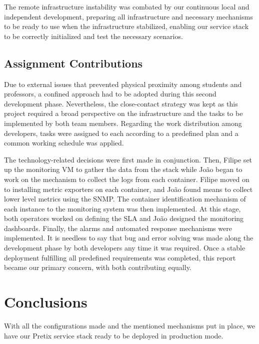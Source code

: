 \documentclass[12pt]{article}
\begin{document}
The remote infrastructure instability was combated by our continuous local and independent development, preparing all infrastructure and necessary mechanisms to be ready to use when the infrastructure stabilized, enabling our service stack to be correctly initialized and test the necessary scenarios.

\subsection{Assignment Contributions} \label{remarks.contributions} %


Due to external issues that prevented physical proximity among students and professors, a confined approach had to be adopted during this second development phase.
Nevertheless, the close-contact strategy was kept as this project required a broad perspective on the infrastructure and the tasks to be implemented by both team members.
Regarding the work distribution among developers, tasks were assigned to each according to a predefined plan and a common working schedule was applied.

The technology-related decisions were first made in conjunction.
Then, Filipe set up the monitoring VM to gather the data from the stack while João began to work on the mechanism to collect the logs from each container.
Filipe moved on to installing metric exporters on each container, and João found means to collect lower level metrics using the SNMP.
The container identification mechanism of each instance to the monitoring system was then implemented.
At this stage, both operators worked on defining the SLA and João designed the monitoring dashboards.
Finally, the alarms and automated response mechanisms were implemented.
It is needless to say that bug and error solving was made along the development phase by both developers any time it was required.
Once a stable deployment fulfilling all predefined requirements was completed, this report became our primary concern, with both contributing equally.

\section*{Conclusions} \label{conclusions} %
With all the configurations made and the mentioned mechanisms put in place, we have our Pretix service stack ready to be deployed in production mode.
\end{document}
